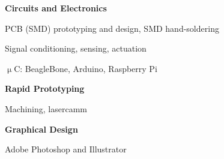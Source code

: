 \documentclass[10pt]{article}
\newcommand{\blankline}{\quad\pagebreak[3]}
\begin{document}
\blankline

\textbf{Circuits and Electronics}
\begin{innerlist}
    \item PCB (SMD) prototyping and design, SMD hand-soldering
    \item Signal conditioning, sensing, actuation
    \item $\upmu$C: BeagleBone, Arduino, Raspberry Pi
\end{innerlist}

\blankline

\textbf{Rapid Prototyping}
\begin{innerlist}
    \item Machining, lasercamm
\end{innerlist}

\blankline

\textbf{Graphical Design}
\begin{innerlist}
    \item Adobe Photoshop and Illustrator
\end{innerlist}





\end{document}
